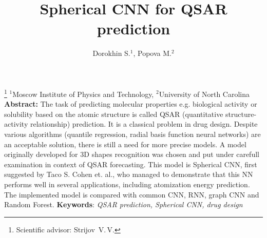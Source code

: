 \documentclass[12pt,twoside]{article}
\begin{document}
\title
{Spherical CNN for QSAR prediction}
\author
{Dorokhin S.$^1$, Popova M.$^2$} %
\thanks
{Scientific advisor:  Strijov~V.\,V.
}
\organization
{$^1$Moscow Institute of Physics and Technology, $^2$University of North Carolina}
\abstract
{
    \textbf{Abstract:}
    The task of predicting molecular properties e.g. biological activity or solubility based on the atomic structure is called QSAR (quantitative structure-activity relationship) prediction.
    It is a classical problem in drug design.
    Despite various algorithms (quantile regression, radial basis function neural networks) are an acceptable solution, there is still a need for more precise models. 
    A model originally developed for 3D shapes recognition was chosen and put under carefull examination in context of QSAR forecasting.
    This model is Spherical CNN, first suggested by Taco S. Cohen et. al., who managed to demonstrate that this NN performs well in several applications, including atomization energy prediction.
    The implemented model is compared with common CNN, RNN, graph CNN and Random Forest.    
\bigskip
\newline
\textbf{Keywords}: \emph {QSAR prediction, Spherical CNN, drug design}
}
\maketitle
\end{document}
